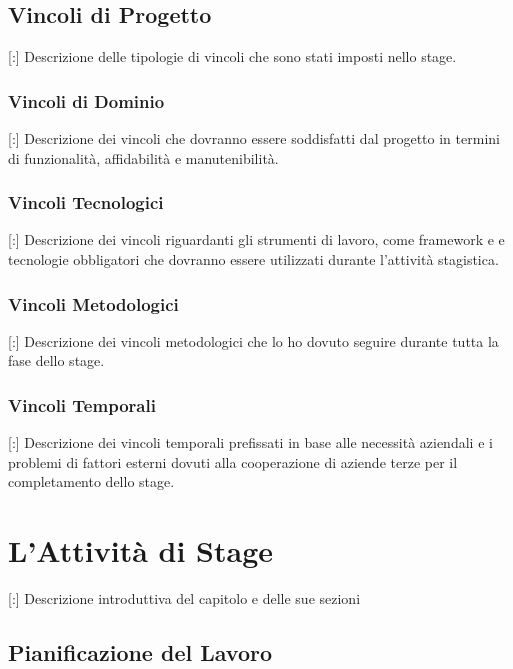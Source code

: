 \documentclass[11pt]{book}              %
\begin{document}
\section{Vincoli di Progetto}

[:] Descrizione delle tipologie di vincoli che sono stati imposti nello stage.

\subsection{Vincoli di Dominio}

[:] Descrizione dei vincoli che dovranno essere soddisfatti dal progetto in termini di funzionalità, affidabilità e manutenibilità. 

\subsection{Vincoli Tecnologici}

[:] Descrizione dei vincoli riguardanti gli strumenti di lavoro, come framework e  e tecnologie obbligatori che dovranno essere utilizzati durante l'attività stagistica.

\subsection{Vincoli Metodologici}

[:] Descrizione dei vincoli metodologici che lo ho dovuto seguire durante tutta la fase dello stage.

\subsection{Vincoli Temporali}

[:] Descrizione dei vincoli temporali prefissati in base alle necessità aziendali e i problemi di fattori esterni dovuti alla cooperazione di aziende terze per il completamento dello stage.

\chapter{L'Attività di Stage}
\thispagestyle{fancy} 

[:] Descrizione introduttiva del capitolo e delle sue sezioni

\section{Pianificazione del Lavoro}
\end{document}
